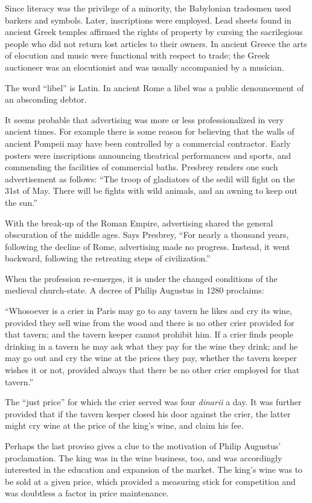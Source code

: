 \documentclass[nohyper,openany,nobib]{tufte-book}
\begin{document}
Since literacy was the privilege of a minority, the Babylonian tradesmen
used barkers and symbols. Later, inscriptions were employed. Lead sheets
found in ancient Greek temples affirmed the rights of property by
cursing the sacrilegious people who did not return lost articles to
their owners. In ancient Greece the arts of elocution and music were
functional with respect to trade; the Greek auctioneer was an
elocutionist and was usually accompanied by a musician.

The word ``libel'' is Latin. In ancient Rome a libel was a public
denouncement of an absconding debtor.

It seems probable that advertising was more or less professionalized in
very ancient times. For example there is some reason for believing that
the walls of ancient Pompeii may have been controlled by a commercial
contractor. Early posters were inscriptions announcing theatrical
performances and sports, and commending the facilities of commercial
baths. Presbrey renders one such advertisement as follows: ``The troop
of gladiators of the sedil will fight on the 31st of May. There will be
fights with wild animals, and an awning to keep out the sun.''

With the break-up of the Roman Empire, advertising shared the general
obscuration of the middle ages. Says Presbrey, ``For nearly a thousand
years, following the decline of Rome, advertising made no progress.
Instead, it went backward, following the retreating steps of
civilization.''

When the profession re-emerges, it is under the changed conditions of
the medieval church-state. A decree of Philip Augustus in 1280
proclaims:

``Whosoever is a crier in Paris may go to any tavern he likes and cry
its wine, provided they sell wine from the wood and there is no other
crier provided for that tavern; and the tavern keeper cannot prohibit
him. If a crier finds people drinking in a tavern he may ask what they
pay for the wine they drink; and he may go out and cry the wine at the
prices they pay, whether the tavern keeper wishes it or not, provided
always that there be no other crier employed for that tavern.''

The ``just price'' for which the crier served was four \emph{dinarii} a
day. It was further provided that if the tavern keeper closed his door
against the crier, the latter might cry wine at the price of the king's
wine, and claim his fee.

Perhaps the last proviso gives a clue to the motivation of Philip
Augustus' proclamation. The king was in the wine business, too, and was
accordingly interested in the education and expansion of the market. The
king's wine was to be sold at a given price, which provided a measuring
stick for competition and was doubtless a factor in price maintenance.
\end{document}
